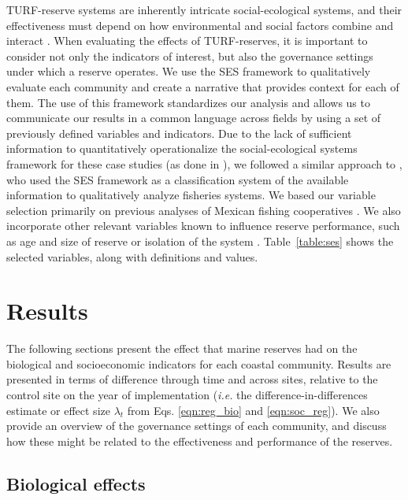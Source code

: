 \documentclass[10pt,letterpaper]{article}
\begin{document}
TURF-reserve systems are inherently intricate social-ecological systems, and their effectiveness must depend on how environmental and social factors combine and interact \cite{ostrom_2009,gelcich_2015}. When evaluating the effects of TURF-reserves, it is important to consider not only the indicators of interest, but also the governance settings under which a reserve operates. We use the SES framework to qualitatively evaluate each community and create a narrative that provides context for each of them. The use of this framework standardizes our analysis and allows us to communicate our results in a common language across fields by using a set of previously defined variables and indicators. Due to the lack of sufficient information to quantitatively operationalize the social-ecological systems framework for these case studies (as done in \cite{leslie_2015-na}), we followed a similar approach to \cite{basurto_2013-oq}, who used the SES framework as a classification system of the available information to qualitatively analyze fisheries systems. We based our variable selection primarily on previous analyses of Mexican fishing cooperatives \cite{leslie_2015-na,basurto_2013-oq}. We also incorporate other relevant variables known to influence reserve performance, such as age and size of reserve or isolation of the system \cite{difranco_2016-Xw,edgar_2014-UO}. Table~\ref{table:ses} shows the selected variables, along with definitions and values.

\section*{Results}

The following sections present the effect that marine reserves had on the biological and socioeconomic indicators for each coastal community. Results are presented in terms of difference through time and across sites, relative to the control site on the year of implementation (\emph{i.e.} the difference-in-differences estimate or effect size $\lambda_t$ from Eqs. \ref{eqn:reg_bio} and \ref{eqn:soc_reg}). We also provide an overview of the governance settings of each community, and discuss how these might be related to the effectiveness and performance of the reserves.

\subsection*{Biological effects}
\end{document}
